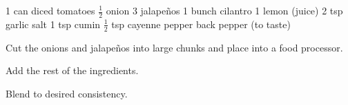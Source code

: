 \dishtype{\apps}
\dishother{\vegetarian}
\begin{ingreds}
    1 can diced tomatoes
    $\frac{1}{2}$ onion
    3 jalape\~nos
    1 bunch cilantro
    1 lemon (juice)
    2 tsp garlic salt
    1 tsp cumin
    $\frac{1}{2}$ tsp cayenne pepper
    back pepper (to taste)
\end{ingreds}
\begin{method}
    Cut the onions and jalape\~nos into large chunks and place into a food processor.\par
    Add the rest of the ingredients.\par
    Blend to desired consistency.
\end{method}